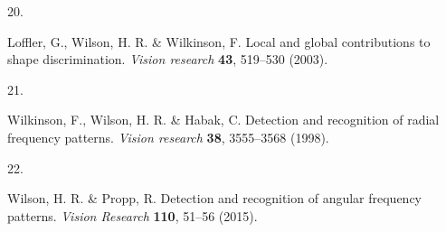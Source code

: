 \documentclass[
  letterpaper,
  DIV=11,
  numbers=noendperiod]{scrartcl}
\newlength{\cslhangindent}
\newlength{\csllabelwidth}
\newenvironment{CSLReferences}[2] %
 {\begin{list}{}{%
  \setlength{\itemindent}{0pt}
  \setlength{\leftmargin}{0pt}
  \setlength{\parsep}{0pt}
  \ifodd #1
   \setlength{\leftmargin}{\cslhangindent}
   \setlength{\itemindent}{-1\cslhangindent}
  \fi
  \setlength{\itemsep}{#2\baselineskip}}}
 {\end{list}}
\newcommand{\CSLLeftMargin}[1]{\parbox[t]{\csllabelwidth}{\strut#1\strut}}
\newcommand{\CSLRightInline}[1]{\parbox[t]{\linewidth - \csllabelwidth}{\strut#1\strut}}
\begin{document}
\begin{CSLReferences}{0}{0}
\CSLLeftMargin{20. }%
\CSLRightInline{Loffler, G., Wilson, H. R. \& Wilkinson, F. Local and
global contributions to shape discrimination. \emph{Vision research}
\textbf{43}, 519--530 (2003).}

\CSLLeftMargin{21. }%
\CSLRightInline{Wilkinson, F., Wilson, H. R. \& Habak, C. Detection and
recognition of radial frequency patterns. \emph{Vision research}
\textbf{38}, 3555--3568 (1998).}

\CSLLeftMargin{22. }%
\CSLRightInline{Wilson, H. R. \& Propp, R. Detection and recognition of
angular frequency patterns. \emph{Vision Research} \textbf{110}, 51--56
(2015).}

\end{CSLReferences}
\end{document}
